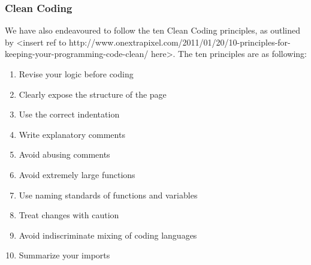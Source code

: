 \documentclass[12pt, a4paper]{article}
\begin{document}
\subsubsection{Clean Coding}
We have also endeavoured to follow the ten Clean Coding principles, as outlined by <insert ref to http://www.onextrapixel.com/2011/01/20/10-principles-for-keeping-your-programming-code-clean/ here>.
The ten principles are as following:
\begin{enumerate}

\item Revise your logic before coding
\item Clearly expose the structure of the page
\item Use the correct indentation
\item Write explanatory comments
\item Avoid abusing comments
\item Avoid extremely large functions
\item Use naming standards of functions and variables
\item Treat changes with caution
\item Avoid indiscriminate mixing of coding languages
\item Summarize your imports

\end{enumerate}
\end{document}

